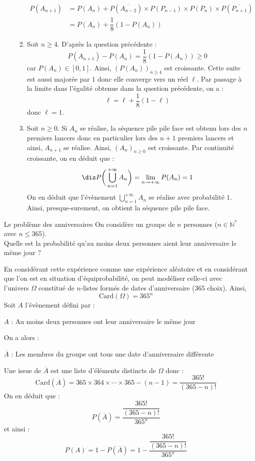 \documentclass[a4paper,10pt]{report}
\begin{document}
\begin{enumerate}
\begin{enumerate}
\begin{align*}
P(A_{n+1}) & = P(A_n) +   P(\overline{A_{n-2}}) \times P( P_{n-1}) \times P(P_n) \times P(\overline{P_{n+1}}) \\
& = P(A_n) + \dfrac{1}{8} (1-P(A_n))
\end{align*}
\item Soit $n \geq 4$. D'après la question précédente :
$$ P(A_{n+1})-P(A_n)= \dfrac{1}{8} (1-P(A_n)) \geq 0$$
car $P(A_n) \in [0,1]$. Ainsi, $(P(A_n))_{n \geq 4}$ est croissante. Cette suite est aussi majorée par $1$ donc elle converge vers un réel $\ell$. Par passage à la limite dans l'égalité obtenue dans la question précédente, on a :
$$ \ell = \ell + \dfrac{1}{8}(1- \ell)$$
donc $\ell =1$.
\item Soit $n \geq 0$. Si $A_{n}$ se réalise, la séquence pile pile face est obtenu lors des $n$ premiers lancers donc en particulier lors des $n+1$ premiers lancers et ainsi, $A_{n+1}$ se réalise. Ainsi, $(A_n)_{n \geq 0}$ est croissante. Par continuité croissante, on en déduit que :
$$\dis P \bigg{(} \bigcup_{n=1}^{+  \infty} A_n \bigg{)} = \lim_{n \rightarrow + \infty} P(A_n) = 1$$
On en déduit que l'évènement $\bigcup_{n=1}^{+  \infty} A_n $ se réalise avec probabilité $1$. Ainsi, presque-surement, on obtient la séquence pile pile face.
\end{enumerate}
\end{enumerate}

\begin{Exercice}{Le problème des anniversaires}
On considère un groupe de $n$ personnes ($n \in \mathbb{N}^*$ avec $n \leq 365$).\\
Quelle est la probabilité qu'au moins deux personnes aient leur anniversaire le même jour ?
\end{Exercice}

\corr En considérant cette expérience comme une expérience aléatoire et en considérant que l'on est en situation d'équiprobabilité, on peut modéliser celle-ci avec l'univers $\Omega$ constitué de $n$-listes formés de dates d'anniversaire ($365$ choix). Ainsi,
$$ \textrm{Card}(\Omega) = 365^n$$
Soit $A$ l'évènement défini par :

\begin{center}
$A$ : \og Au moins deux personnes ont leur anniversaire le même jour \fg{} 
\end{center}
On a alors :
\begin{center}
$\overline{A}$ : \og Les membres du groupe ont tous une date d'anniversaire différente \fg{} 
\end{center}
Une issue de $\overline{A}$ est une liste d'éléments distincts de $\Omega$ donc :
$$ \textrm{Card}(\overline{A}) = 365 \times 364 \times \cdots \times 365-(n-1) = \dfrac{365!}{(365-n)!}$$
On en déduit que :
$$ P(\overline{A}) = \dfrac{\dfrac{365!}{(365-n)!}}{365^n}$$
et ainsi :
$$ P(A) = 1- P(\overline{A}) = 1 - \dfrac{\dfrac{365!}{(365-n)!}}{365^n}$$
\end{document}
